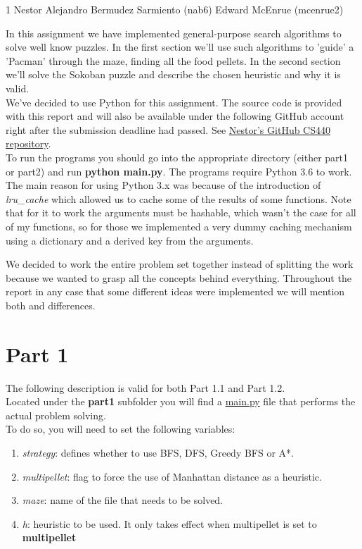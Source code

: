 \documentclass[11pt]{article}
\begin{document}
\homework
    {1}
    {Nestor Alejandro Bermudez Sarmiento (nab6)}
    {Edward McEnrue (mcenrue2)}

In this assignment we have implemented general-purpose search algorithms to solve well know puzzles. In the first section we'll use such algorithms to 'guide' a 'Pacman' through the maze, finding all the food pellets. In the second section we'll solve the Sokoban puzzle and describe the chosen heuristic and why it is valid.\\

We've decided to use Python for this assignment. The source code is provided with this report and will also be available under the following GitHub account right after the submission deadline had passed. See \href{https://github.com/nbermudezs/UIUC_CS440}{Nestor's GitHub CS440 repository}.\\

To run the programs you should go into the appropriate directory (either part1 or part2) and run \textbf{python main.py}. The programs require Python 3.6 to work. The main reason for using Python 3.x was because of the introduction of \textit{lru\_cache} which allowed us to cache some of the results of some functions. Note that for it to work the arguments must be hashable, which wasn't the case for all of my functions, so for those we implemented a very dummy caching mechanism using a dictionary and a derived key from the arguments.

We decided to work the entire problem set together instead of splitting the work because we wanted to grasp all the concepts behind everything. Throughout the report in any case that some different ideas were implemented we will mention both and differences.

\section*{Part 1}
The following description is valid for both Part 1.1 and Part 1.2.\\

Located under the \textbf{part1} subfolder you will find a \href{https://github.com/nbermudezs/UIUC_CS440/tree/master/assignment1/part1/main.py}{main.py} file that performs the actual problem solving.\\ To do so, you will need to set the following variables:
\begin{enumerate}
\item \textit{strategy}: defines whether to use BFS, DFS, Greedy BFS or A*. 
\item \textit{multipellet}: flag to force the use of Manhattan distance as a heuristic.
\item \textit{maze}: name of the file that needs to be solved.
\item \textit{h}: heuristic to be used. It only takes effect when multipellet is set to \textbf{multipellet}
\end{enumerate}
\end{document}
